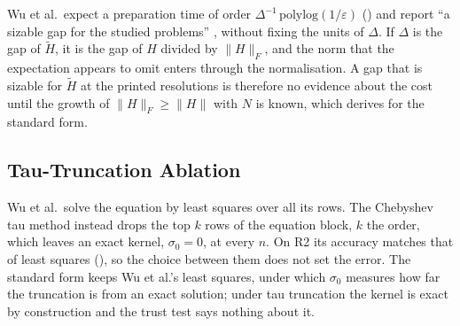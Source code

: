 Wu et al.\ expect a preparation time of order $\Delta^{-1}\,\mathrm{polylog}(1/\varepsilon)$ () and report ``a sizable gap for the studied problems'' \cite{wu2025pihm}, without fixing the units of $\Delta$. If $\Delta$ is the gap of $\tilde H$, it is the gap of $H$ divided by $\|H\|_F$, and the norm that the expectation appears to omit enters through the normalisation. A gap that is sizable for $\tilde H$ at the printed resolutions is therefore no evidence about the cost until the growth of $\|H\|_F\ge\|H\|$ with $N$ is known, which  derives for the standard form.

\subsection{Tau-Truncation Ablation}
\label{app:repro-tau}

Wu et al.\ solve the equation by least squares over all its rows. The Chebyshev tau method instead drops the top $k$ rows of the equation block, $k$ the order, which leaves an exact kernel, $\sigma_0=0$, at every $n$. On R2 its accuracy matches that of least squares (), so the choice between them does not set the error. The standard form keeps Wu et al.'s least squares, under which $\sigma_0$ measures how far the truncation is from an exact solution; under tau truncation the kernel is exact by construction and the trust test says nothing about it.

